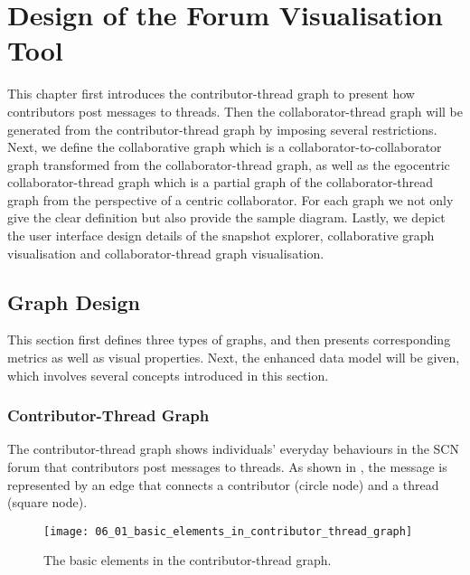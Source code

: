 \chapter{Design of the Forum Visualisation Tool} \label{Chapter:Design}

This chapter first introduces the contributor-thread graph to present how contributors post messages to threads. Then the collaborator-thread graph will be generated from the contributor-thread graph by imposing several restrictions. Next, we define the collaborative graph which is a collaborator-to-collaborator graph transformed from the collaborator-thread graph, as well as the egocentric collaborator-thread graph which is a partial graph of the collaborator-thread graph from the perspective of a centric collaborator. For each graph we not only give the clear definition but also provide the sample diagram. Lastly, we depict the user interface design details of the snapshot explorer, collaborative graph visualisation and collaborator-thread graph visualisation.

\section{Graph Design} \label{sec:graph_design}

This section first defines three types of graphs, and then presents corresponding metrics as well as visual properties. Next, the enhanced data model will be given, which involves several concepts introduced in this section.
 
\subsection{Contributor-Thread Graph} \label{sec:contributor_thread_graph}

The contributor-thread graph shows individuals' everyday behaviours in the SCN forum that contributors post messages to threads. As shown in , the message is represented by an edge that connects a contributor (circle node) and a thread (square node).

\begin{figure}[!htb]
  \centering
  \texttt{[image: 06\_01\_basic\_elements\_in\_contributor\_thread\_graph]}
  \caption{The basic elements in the contributor-thread graph.}
  \label{Figure:06_01}
\end{figure}

